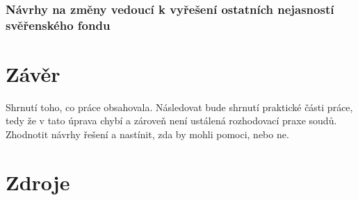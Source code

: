 \documentclass{article}
\begin{document}
\subsubsection{Návrhy na změny vedoucí k vyřešení ostatních nejasností svěřenského fondu}

\newpage

\section{Závěr}

Shrnutí toho, co práce obsahovala. Následovat bude shrnutí praktické části práce, tedy že v tato úprava chybí a zároveň není ustálená rozhodovací praxe soudů. Zhodnotit návrhy řešení a nastínit, zda by mohli pomoci, nebo ne.

\newpage
\thispagestyle{Contents}
\section*{Zdroje}
\setcounter{SecZdroje}{\thesection}
\addtocounter{SecZdroje}{1}
\printbibliography[type=misc,heading=subbibliography,title={Online zdroje}]
\printbibliography[type=book,heading=subbibliography,title={Knižní zdroje}]
\printbibliography[type=article,heading=subbibliography,title={Články}]
\printbibliography[type=proceedings,heading=subbibliography,title={Zákony}]	
\end{document}
